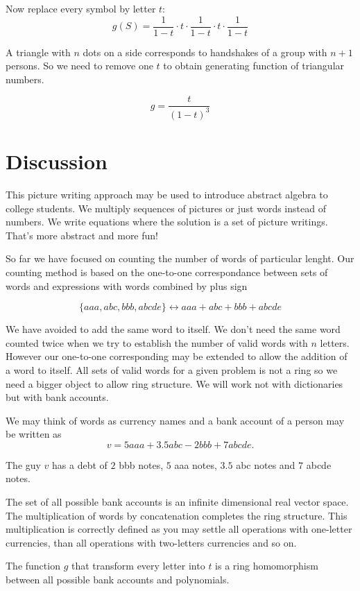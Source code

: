 \documentclass{article}
\begin{document}
Now replace every symbol by letter $t$:
\[
g(S) = 	\frac{1}{1-t} \cdot  t \cdot  \frac{1}{1-t} \cdot t \cdot \frac{1}{1-t} 
\]


A triangle with $n$ dots on a side corresponds to handshakes of a group with $n+1$ persons.
So we need to remove one $t$ to obtain generating function of triangular numbers.

\[
g = \frac{t}{(1-t)^3}
\]


\section{Discussion}


This picture writing approach may be used to introduce abstract algebra to college students. 
We multiply sequences of pictures or just words instead of numbers. 
We write equations where the solution is a set of picture writings. 
That's more abstract and more fun!

So far we have focused on counting the number of words of particular lenght. 
Our counting method is based on the one-to-one correspondance between sets of words and expressions with words combined by plus sign

\[
\{ aaa, abc, bbb, abcde \}  \leftrightarrow aaa + abc + bbb + abcde
\]

We have avoided to add the same word to itself. 
We don't need the same word counted twice when we try to establish the number of valid words with $n$ letters. 
However our one-to-one corresponding may be extended to allow the addition of a word to itself. 
All sets of valid words for a given problem is not a ring so we need a bigger object to allow ring structure.
We will work not with dictionaries but with bank accounts. 

We may think of words as currency names and a bank account of a person may be written as
\[
v = 5 aaa + 3.5 abc - 2 bbb + 7 abcde.
\]

The guy $v$ has a debt of $2$ bbb notes, $5$ aaa notes, $3.5$ abc notes and $7$ abcde notes.

The set of all possible bank accounts is an infinite dimensional real vector space. 
The multiplication of words by concatenation completes the ring structure. 
This multiplication is correctly defined as you may settle all operations with one-letter currencies, 
than all operations with two-letters currencies and so on.

The function $g$ that transform every letter into $t$ is a ring homomorphism between all possible bank accounts and polynomials. 
\end{document}
